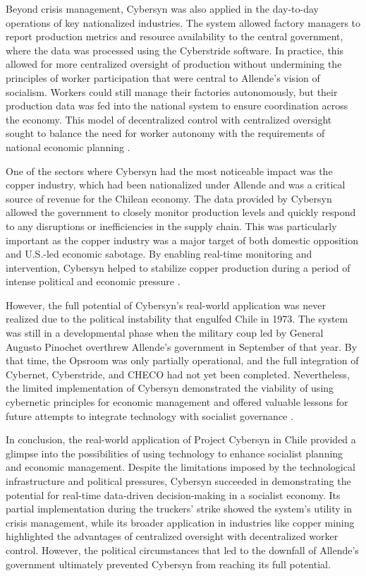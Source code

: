 \begin{refsection}
Beyond crisis management, Cybersyn was also applied in the day-to-day operations of key nationalized industries. The system allowed factory managers to report production metrics and resource availability to the central government, where the data was processed using the Cyberstride software. In practice, this allowed for more centralized oversight of production without undermining the principles of worker participation that were central to Allende’s vision of socialism. Workers could still manage their factories autonomously, but their production data was fed into the national system to ensure coordination across the economy. This model of decentralized control with centralized oversight sought to balance the need for worker autonomy with the requirements of national economic planning \cite[pp.~183-186]{medina2014}.

One of the sectors where Cybersyn had the most noticeable impact was the copper industry, which had been nationalized under Allende and was a critical source of revenue for the Chilean economy. The data provided by Cybersyn allowed the government to closely monitor production levels and quickly respond to any disruptions or inefficiencies in the supply chain. This was particularly important as the copper industry was a major target of both domestic opposition and U.S.-led economic sabotage. By enabling real-time monitoring and intervention, Cybersyn helped to stabilize copper production during a period of intense political and economic pressure \cite[pp.~53-55]{harmer2011}.

However, the full potential of Cybersyn’s real-world application was never realized due to the political instability that engulfed Chile in 1973. The system was still in a developmental phase when the military coup led by General Augusto Pinochet overthrew Allende’s government in September of that year. By that time, the Opsroom was only partially operational, and the full integration of Cybernet, Cyberstride, and CHECO had not yet been completed. Nevertheless, the limited implementation of Cybersyn demonstrated the viability of using cybernetic principles for economic management and offered valuable lessons for future attempts to integrate technology with socialist governance \cite[pp.~195-199]{medina2014}.

In conclusion, the real-world application of Project Cybersyn in Chile provided a glimpse into the possibilities of using technology to enhance socialist planning and economic management. Despite the limitations imposed by the technological infrastructure and political pressures, Cybersyn succeeded in demonstrating the potential for real-time data-driven decision-making in a socialist economy. Its partial implementation during the truckers' strike showed the system’s utility in crisis management, while its broader application in industries like copper mining highlighted the advantages of centralized oversight with decentralized worker control. However, the political circumstances that led to the downfall of Allende’s government ultimately prevented Cybersyn from reaching its full potential.


\end{refsection}

